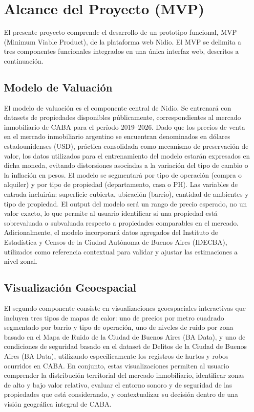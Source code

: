 \section{Alcance del Proyecto (MVP)}

El presente proyecto comprende el desarrollo de un prototipo funcional, MVP (Minimum Viable Product), de la plataforma web Nidio. El MVP se delimita a tres componentes funcionales integrados en una única interfaz web, descritos a continuación.

\subsection{Modelo de Valuación}

El modelo de valuación es el componente central de Nidio. Se entrenará con datasets de propiedades disponibles públicamente, correspondientes al mercado inmobiliario de CABA para el período 2019--2026. Dado que los precios de venta en el mercado inmobiliario argentino se encuentran denominados en dólares estadounidenses (USD), práctica consolidada como mecanismo de preservación de valor, los datos utilizados para el entrenamiento del modelo estarán expresados en dicha moneda, evitando distorsiones asociadas a la variación del tipo de cambio o la inflación en pesos. El modelo se segmentará por tipo de operación (compra o alquiler) y por tipo de propiedad (departamento, casa o PH). Las variables de entrada incluirán: superficie cubierta, ubicación (barrio), cantidad de ambientes y tipo de propiedad. El output del modelo será un rango de precio esperado, no un valor exacto, lo que permite al usuario identificar si una propiedad está sobrevaluada o subvaluada respecto a propiedades comparables en el mercado. Adicionalmente, el modelo incorporará datos agregados del Instituto de Estadística y Censos de la Ciudad Autónoma de Buenos Aires (IDECBA), utilizados como referencia contextual para validar y ajustar las estimaciones a nivel zonal.

\subsection{Visualización Geoespacial}

El segundo componente consiste en visualizaciones geoespaciales interactivas que incluyen tres tipos de mapas de calor: uno de precios por metro cuadrado segmentado por barrio y tipo de operación, uno de niveles de ruido por zona basado en el Mapa de Ruido de la Ciudad de Buenos Aires (BA Data), y uno de condiciones de seguridad basado en el dataset de Delitos de la Ciudad de Buenos Aires (BA Data), utilizando específicamente los registros de hurtos y robos ocurridos en CABA. En conjunto, estas visualizaciones permiten al usuario comprender la distribución territorial del mercado inmobiliario, identificar zonas de alto y bajo valor relativo, evaluar el entorno sonoro y de seguridad de las propiedades que está considerando, y contextualizar su decisión dentro de una visión geográfica integral de CABA.


